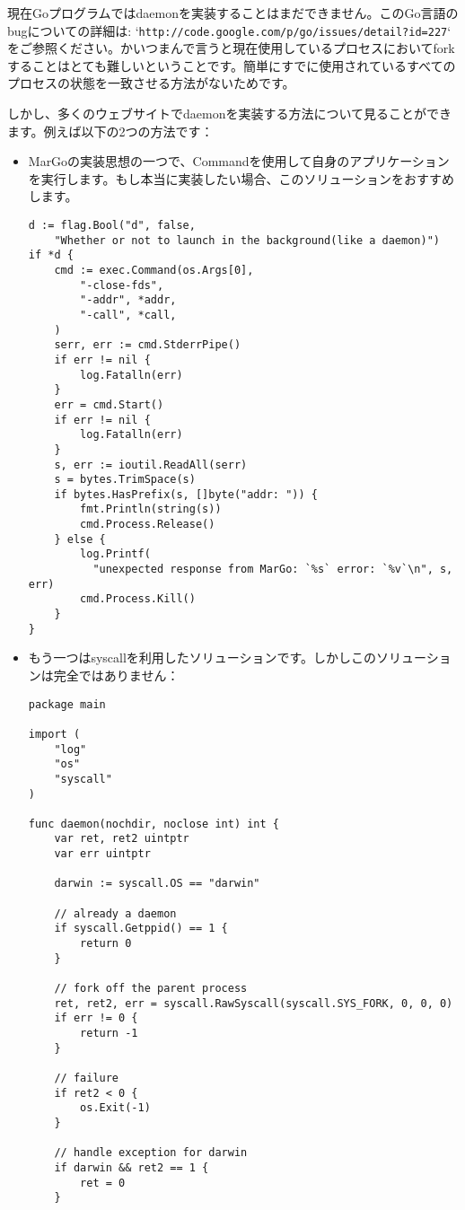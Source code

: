 現在Goプログラムではdaemonを実装することはまだできません。このGo言語のbugについての詳細は: `\texttt{http://code.google.com/p/go/issues/detail?id=227}` をご参照ください。かいつまんで言うと現在使用しているプロセスにおいてforkすることはとても難しいということです。簡単にすでに使用されているすべてのプロセスの状態を一致させる方法がないためです。

しかし、多くのウェブサイトでdaemonを実装する方法について見ることができます。例えば以下の2つの方法です：

\begin{itemize}
  \item MarGoの実装思想の一つで、Commandを使用して自身のアプリケーションを実行します。もし本当に実装したい場合、このソリューションをおすすめします。
\begin{lstlisting}[numbers=none]
d := flag.Bool("d", false,
    "Whether or not to launch in the background(like a daemon)")
if *d {
    cmd := exec.Command(os.Args[0],
        "-close-fds",
        "-addr", *addr,
        "-call", *call,
    )
    serr, err := cmd.StderrPipe()
    if err != nil {
        log.Fatalln(err)
    }
    err = cmd.Start()
    if err != nil {
        log.Fatalln(err)
    }
    s, err := ioutil.ReadAll(serr)
    s = bytes.TrimSpace(s)
    if bytes.HasPrefix(s, []byte("addr: ")) {
        fmt.Println(string(s))
        cmd.Process.Release()
    } else {
        log.Printf(
          "unexpected response from MarGo: `%s` error: `%v`\n", s, err)
        cmd.Process.Kill()
    }
}
\end{lstlisting}
  \item もう一つはsyscallを利用したソリューションです。しかしこのソリューションは完全ではありません：
\begin{lstlisting}[numbers=none]
package main

import (
    "log"
    "os"
    "syscall"
)

func daemon(nochdir, noclose int) int {
    var ret, ret2 uintptr
    var err uintptr

    darwin := syscall.OS == "darwin"

    // already a daemon
    if syscall.Getppid() == 1 {
        return 0
    }

    // fork off the parent process
    ret, ret2, err = syscall.RawSyscall(syscall.SYS_FORK, 0, 0, 0)
    if err != 0 {
        return -1
    }

    // failure
    if ret2 < 0 {
        os.Exit(-1)
    }

    // handle exception for darwin
    if darwin && ret2 == 1 {
        ret = 0
    }


\end{lstlisting}
\end{itemize}
